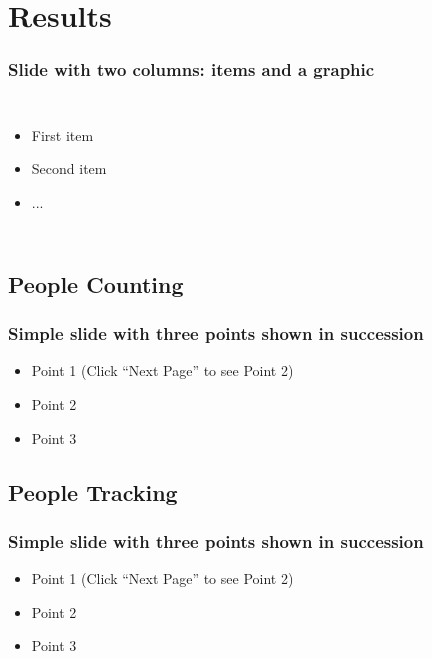\documentclass[]{beamer}
\begin{document}
\section{Results}

\begin{frame}
  \frametitle{Slide with two columns: items and a graphic}   %
  \begin{columns}[c]
  \column{2in}  %
  \begin{itemize}
  \item<1-> First item
  \item<2-> Second item
  \item<3-> ...
  \end{itemize}
  \column{2in}
  \end{columns}
\end{frame}

\subsection{People Counting}

\begin{frame}
  \frametitle{Simple slide with three points shown in succession}   %

  \begin{itemize}
  \item<1-> Point 1 (Click ``Next Page'' to see Point 2) %
  \item<2-> Point 2  %
  \item<3-> Point 3
  \end{itemize}
\end{frame}

\subsection{People Tracking}

\begin{frame}
  \frametitle{Simple slide with three points shown in succession}   %

  \begin{itemize}
  \item<1-> Point 1 (Click ``Next Page'' to see Point 2) %
  \item<2-> Point 2  %
  \item<3-> Point 3
  \end{itemize}
\end{frame}
\end{document}
